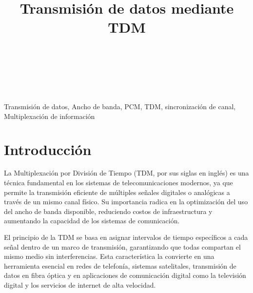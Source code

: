 \documentclass[conference]{IEEEtran}
\begin{document}
	
	\title{Transmisión de datos mediante TDM}
	\author{
		\\
		\\
		\\
		\and
		\and
	}
	
	\maketitle
	\begin{abstract}
		
	\end{abstract}
	\begin{IEEEkeywords}
		Transmisión de datos, Ancho de banda, PCM, TDM, sincronización de canal, Multiplexación de información
	\end{IEEEkeywords}
	
	\section{Introducción}
	
	La Multiplexación por División de Tiempo (TDM, por sus siglas en inglés) es una técnica fundamental en los sistemas de telecomunicaciones modernos, ya que permite la transmisión eficiente de múltiples señales digitales o analógicas a través de un mismo canal físico. Su importancia radica en la optimización del uso del ancho de banda disponible, reduciendo costos de infraestructura y aumentando la capacidad de los sistemas de comunicación.
	
	El principio de la TDM se basa en asignar intervalos de tiempo específicos a cada señal dentro de un marco de transmisión, garantizando que todas compartan el mismo medio sin interferencias. Esta característica la convierte en una herramienta esencial en redes de telefonía, sistemas satelitales, transmisión de datos en fibra óptica y en aplicaciones de comunicación digital como la televisión digital y los servicios de internet de alta velocidad.
	
\end{document}

